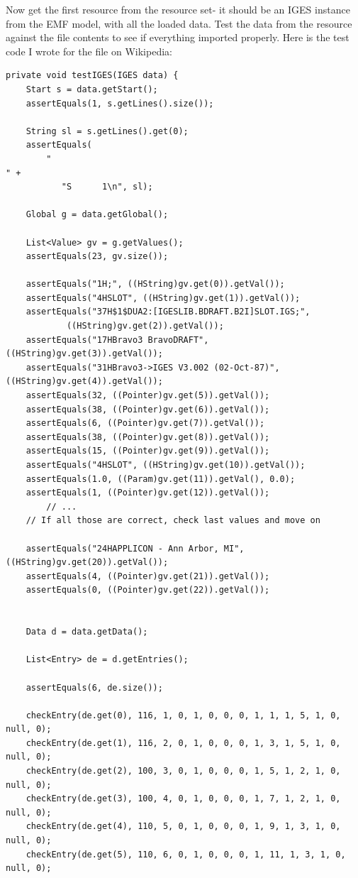 Now get the first resource from the resource set- it should be an IGES instance from the EMF model, with all the loaded data. Test the data from the resource against the file contents to see if everything imported properly. Here is the test code I wrote for the file on Wikipedia:

\newpage

\begin{Verbatim}
private void testIGES(IGES data) {
	Start s = data.getStart();
	assertEquals(1, s.getLines().size());
		
	String sl = s.getLines().get(0);
	assertEquals(
        "                                                                       " +
           "S      1\n", sl);
		
	Global g = data.getGlobal();
		
	List<Value> gv = g.getValues();
	assertEquals(23, gv.size());
	    
	assertEquals("1H;", ((HString)gv.get(0)).getVal());
	assertEquals("4HSLOT", ((HString)gv.get(1)).getVal());
	assertEquals("37H$1$DUA2:[IGESLIB.BDRAFT.B2I]SLOT.IGS;",
            ((HString)gv.get(2)).getVal());
	assertEquals("17HBravo3 BravoDRAFT", ((HString)gv.get(3)).getVal());
	assertEquals("31HBravo3->IGES V3.002 (02-Oct-87)", ((HString)gv.get(4)).getVal());
	assertEquals(32, ((Pointer)gv.get(5)).getVal());
	assertEquals(38, ((Pointer)gv.get(6)).getVal());
	assertEquals(6, ((Pointer)gv.get(7)).getVal());
	assertEquals(38, ((Pointer)gv.get(8)).getVal());
	assertEquals(15, ((Pointer)gv.get(9)).getVal());
	assertEquals("4HSLOT", ((HString)gv.get(10)).getVal());
	assertEquals(1.0, ((Param)gv.get(11)).getVal(), 0.0);
	assertEquals(1, ((Pointer)gv.get(12)).getVal());
        // ...
	// If all those are correct, check last values and move on
	
	assertEquals("24HAPPLICON - Ann Arbor, MI", ((HString)gv.get(20)).getVal());
	assertEquals(4, ((Pointer)gv.get(21)).getVal());
	assertEquals(0, ((Pointer)gv.get(22)).getVal());
	
	
	Data d = data.getData();
	
	List<Entry> de = d.getEntries();
	
	assertEquals(6, de.size());

	checkEntry(de.get(0), 116, 1, 0, 1, 0, 0, 0, 1, 1, 1, 5, 1, 0, null, 0);
	checkEntry(de.get(1), 116, 2, 0, 1, 0, 0, 0, 1, 3, 1, 5, 1, 0, null, 0);
	checkEntry(de.get(2), 100, 3, 0, 1, 0, 0, 0, 1, 5, 1, 2, 1, 0, null, 0);
	checkEntry(de.get(3), 100, 4, 0, 1, 0, 0, 0, 1, 7, 1, 2, 1, 0, null, 0);
	checkEntry(de.get(4), 110, 5, 0, 1, 0, 0, 0, 1, 9, 1, 3, 1, 0, null, 0);
	checkEntry(de.get(5), 110, 6, 0, 1, 0, 0, 0, 1, 11, 1, 3, 1, 0, null, 0);
	

\end{Verbatim}
